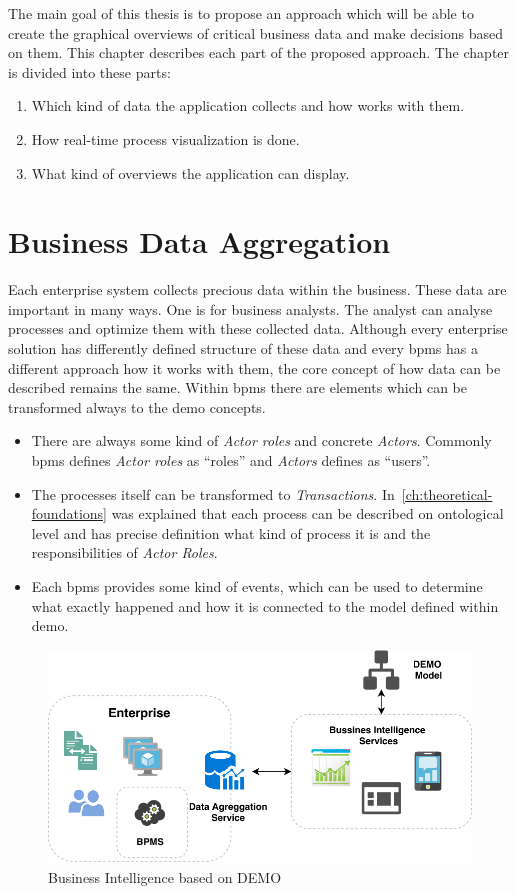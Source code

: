 The main goal of this thesis is to propose an approach which will be able to create the graphical overviews of critical business data and make decisions based on them. This chapter describes each part of the proposed approach. The chapter is divided into these parts:    
    \begin{enumerate}
      \item Which kind of data the application collects and how works with them.
      \item How real-time process visualization is done.
      \item What kind of overviews the application can display. 
    \end{enumerate}
\section{Business Data Aggregation}
Each enterprise system collects precious data within the business. These data are important in many ways. One is for business analysts. The analyst can analyse processes and optimize them with these collected data. Although every enterprise solution has differently defined structure of these data and every \gls{bpms} has a different approach how it works with them, the core concept of how data can be described remains the same. 
Within \gls{bpms} there are elements which can be transformed always to the \gls{demo} concepts.
\begin{itemize}
\item There are always some kind of \textit{Actor roles} and concrete \textit{Actors}. Commonly \gls{bpms} defines \textit{Actor roles} as ``roles'' and \textit{Actors} defines as ``users''.
\item The processes itself can be transformed to \textit{Transactions}. In~\cref{ch:theoretical-foundations} was explained that each process can be described on ontological level and has precise definition what kind of process it is and the responsibilities of \textit{Actor Roles}.
\item Each \gls{bpms} provides some kind of events, which can be used to determine what exactly happened and how it is connected to the model defined within \gls{demo}.
\end{itemize}

\begin{figure}[ht!]
  \centering
  \includegraphics[width=12cm,keepaspectratio]{img/bi-demo-overview}
  \caption{Business Intelligence based on DEMO}
  \label{fig:bi-demo-overview}
\end{figure}    

